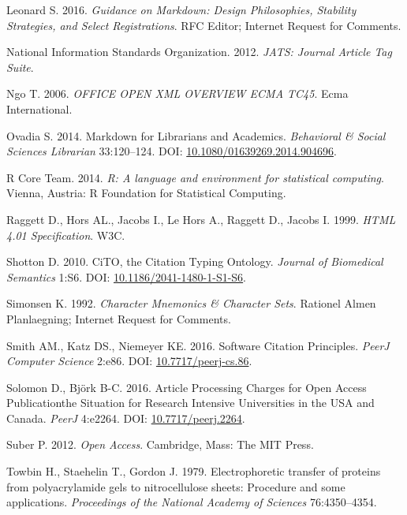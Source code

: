 \documentclass[10pt,fleqn]{wlpeerj}
\begin{document}
\hypertarget{ref-rfc7764}{}
Leonard S. 2016. \emph{Guidance on Markdown: Design Philosophies,
Stability Strategies, and Select Registrations}. RFC Editor; Internet
Request for Comments.

\hypertarget{ref-JATS}{}
National Information Standards Organization. 2012. \emph{JATS: Journal
Article Tag Suite}.

\hypertarget{ref-OOXML}{}
Ngo T. 2006. \emph{OFFICE OPEN XML OVERVIEW ECMA TC45}. Ecma
International.

\hypertarget{ref-ovadiaux5fmarkdownux5f2014}{}
Ovadia S. 2014. Markdown for Librarians and Academics. \emph{Behavioral
\& Social Sciences Librarian} 33:120--124. DOI:
\href{https://doi.org/10.1080/01639269.2014.904696}{10.1080/01639269.2014.904696}.

\hypertarget{ref-Rux5f2014}{}
R Core Team. 2014. \emph{R: A language and environment for statistical
computing}. Vienna, Austria: R Foundation for Statistical Computing.

\hypertarget{ref-HTML4}{}
Raggett D., Hors AL., Jacobs I., Le Hors A., Raggett D., Jacobs I. 1999.
\emph{HTML 4.01 Specification}. W3C.

\hypertarget{ref-shottonux5fcitoux5f2010}{}
Shotton D. 2010. CiTO, the Citation Typing Ontology. \emph{Journal of
Biomedical Semantics} 1:S6. DOI:
\href{https://doi.org/10.1186/2041-1480-1-S1-S6}{10.1186/2041-1480-1-S1-S6}.

\hypertarget{ref-rfc1345}{}
Simonsen K. 1992. \emph{Character Mnemonics \& Character Sets}. Rationel
Almen Planlaegning; Internet Request for Comments.

\hypertarget{ref-smithux5fsoftwareux5f2016}{}
Smith AM., Katz DS., Niemeyer KE. 2016. Software Citation Principles.
\emph{PeerJ Computer Science} 2:e86. DOI:
\href{https://doi.org/10.7717/peerj-cs.86}{10.7717/peerj-cs.86}.

\hypertarget{ref-solomonux5farticleux5f2016}{}
Solomon D., Björk B-C. 2016. Article Processing Charges for Open Access
Publicationthe Situation for Research Intensive Universities in the USA
and Canada. \emph{PeerJ} 4:e2264. DOI:
\href{https://doi.org/10.7717/peerj.2264}{10.7717/peerj.2264}.

\hypertarget{ref-suberux5fopenux5f2012}{}
Suber P. 2012. \emph{Open Access}. Cambridge, Mass: The MIT Press.

\hypertarget{ref-towbinux5felectrophoreticux5f1979}{}
Towbin H., Staehelin T., Gordon J. 1979. Electrophoretic transfer of
proteins from polyacrylamide gels to nitrocellulose sheets: Procedure
and some applications. \emph{Proceedings of the National Academy of
Sciences} 76:4350--4354.
\end{document}
